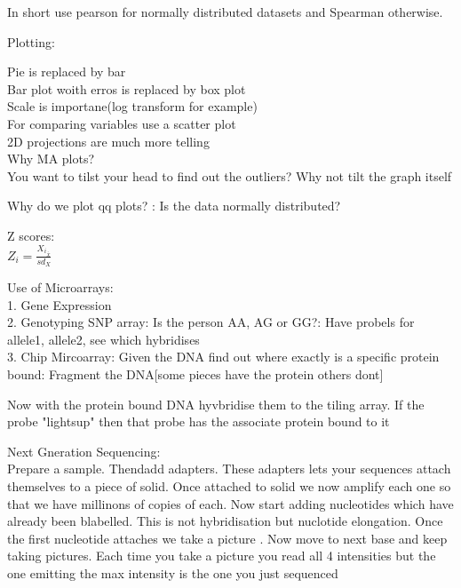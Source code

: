 \documentclass[a4paper]{article}
\begin{document}
In short use pearson for normally distributed datasets and Spearman otherwise.

Plotting:

Pie is replaced by bar\\

Bar plot woith erros is replaced by box plot\\

Scale is importane(log transform for example)\\

For comparing variables use a scatter plot\\

2D projections are much more telling\\

Why MA plots? \\

You want to tilst your head to find out the outliers? Why not tilt the graph itself


Why do we plot qq plots? : Is the data normally distributed?


Z scores: \\

\begin{math}
Z_i= \frac{X_i_\bar{X}}{sd_X}
\end{math}


Use of Microarrays:\\

1. Gene Expression \\
2. Genotyping SNP array: Is the person AA, AG or GG?: Have probels for allele1, allele2, see which hybridises\\

3. Chip Mircoarray: Given the DNA find out where exactly is a specific protein bound: Fragment the DNA[some pieces have the protein others dont]

Now with the protein bound DNA hyvbridise them to the tiling array. If the probe "lightsup" then that probe has the associate protein 
bound to it


Next Gneration Sequencing:\\

Prepare a sample. Thendadd adapters. These adapters lets your sequences attach themselves to a piece
of solid. Once attached to solid we now amplify each one so that we have millinons of 
copies of each. Now start adding nucleotides which have already been blabelled. This
is not hybridisation but nuclotide elongation. Once the first nucleotide
attaches we take a picture . Now move to next base and keep taking pictures.
Each time you take a picture you read all 4 intensities but the one emitting the max intensity is the
one you just sequenced
\end{document}
